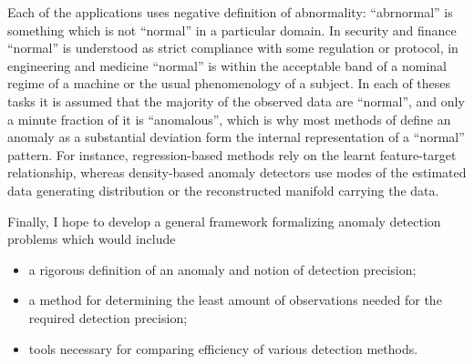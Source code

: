 \documentclass{extarticle}
\begin{document}
Each of the applications uses negative definition of abnormality: ``abrnormal'' is
something which is not ``normal'' in a particular domain. In security and finance
``normal'' is understood as strict compliance with some regulation or protocol, in
engineering and medicine ``normal'' is within the acceptable band of a nominal regime
of a machine or the usual phenomenology of a subject. In each of theses tasks it is
assumed that the majority of the observed data are ``normal'', and only a minute
fraction of it is ``anomalous'', which is why most methods of define an anomaly
as a substantial deviation form the internal representation of a ``normal'' pattern.
For instance, regression-based methods rely on the learnt feature-target relationship,
whereas density-based anomaly detectors use modes of the estimated data generating
distribution or the reconstructed manifold carrying the data.

Finally, I hope to develop a general framework formalizing anomaly detection problems
which would include\begin{itemize}
  \item a rigorous definition of an anomaly and notion of detection precision;
  \item a method for determining the least amount of observations needed for the
  required detection precision;
  \item tools necessary for comparing efficiency of various detection methods.
\end{itemize}


% 
\clearpage


\end{document}

